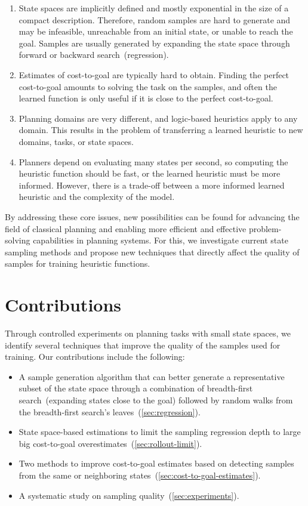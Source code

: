\begin{enumerate}[label=C\arabic*),left=0pt]
    \itemsep0pt
    \item State spaces are implicitly defined and mostly exponential in the size of a compact description. Therefore, random samples are hard to generate and may be infeasible, unreachable from an initial state, or unable to reach the goal. Samples are usually generated by expanding the state space through forward or backward search~(regression).
    \item Estimates of cost-to-goal are typically hard to obtain. Finding the perfect cost-to-goal amounts to solving the task on the samples, and often the learned function is only useful if it is close to the perfect cost-to-goal.
    \item Planning domains are very different, and logic-based heuristics apply to any domain. This results in the problem of transferring a learned heuristic to new domains, tasks, or state spaces.
    \item Planners depend on evaluating many states per second, so computing the heuristic function should be fast, or the learned heuristic must be more informed. However, there is a trade-off between a more informed learned heuristic and the complexity of the model.
\end{enumerate}

By addressing these core issues, new possibilities can be found for advancing the field of classical planning and enabling more efficient and effective problem-solving capabilities in planning systems. For this, we investigate current state sampling methods and propose new techniques that directly affect the quality of samples for training heuristic functions.

\section{Contributions}
\label{sec:contributions}

Through controlled experiments on planning tasks with small state spaces, we identify several techniques that improve the quality of the samples used for training. Our contributions include the following:

\begin{itemize}
    \item A sample generation algorithm that can better generate a representative subset of the state space through a combination of breadth-first search~(expanding states close to the goal) followed by random walks from the breadth-first search's leaves~(\cref{sec:regression}).
    \item State space-based estimations to limit the sampling regression depth to large big cost-to-goal overestimates~(\cref{sec:rollout-limit}).
    \item Two methods to improve cost-to-goal estimates based on detecting samples from the same or neighboring states~(\cref{sec:cost-to-goal-estimates}).
    \item A systematic study on sampling quality~(\cref{sec:experiments}).
\end{itemize}

